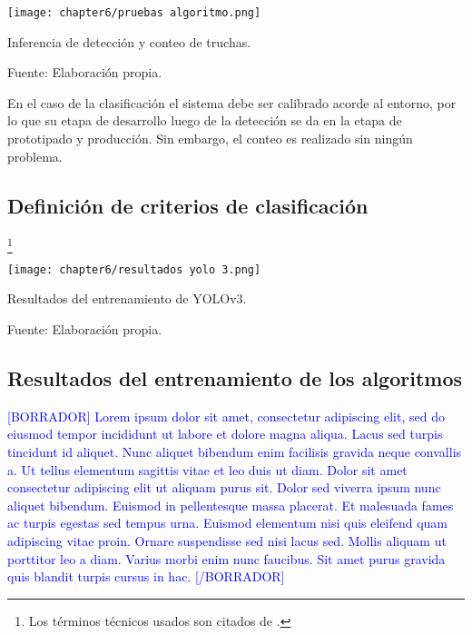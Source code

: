 \begin{myfigure}[H]
	\footnotesize\centering
	\texttt{[image: chapter6/pruebas algoritmo.png]}
	\caption{Inferencia de detección y conteo de truchas.}
	\begin{myflushcenter}
		Fuente: Elaboración propia.
	\end{myflushcenter}
	\label{fig:pruebas algoritmo}
\end{myfigure}

En el caso de la clasificación el sistema debe ser calibrado acorde al entorno, por lo que su etapa de desarrollo luego de la detección se da en la etapa de prototipado y producción. Sin embargo, el conteo es realizado sin ningún problema.





\subsection{Definición de criterios de clasificación}

\footnote{Los términos técnicos usados son citados de \cite{Everingham2010}.}


\begin{myfigure}[H]
	\footnotesize\centering
	\texttt{[image: chapter6/resultados yolo 3.png]}
	\caption{Resultados del entrenamiento de YOLOv3.}
	\begin{myflushcenter}
		Fuente: Elaboración propia.
	\end{myflushcenter}
	\label{fig:resultados yolo 3}
\end{myfigure}



\subsection{Resultados del entrenamiento de los algoritmos}

\textcolor{blue}{[BORRADOR] Lorem ipsum dolor sit amet, consectetur adipiscing elit, sed do eiusmod tempor incididunt ut labore et dolore magna aliqua. Lacus sed turpis tincidunt id aliquet. Nunc aliquet bibendum enim facilisis gravida neque convallis a. Ut tellus elementum sagittis vitae et leo duis ut diam. Dolor sit amet consectetur adipiscing elit ut aliquam purus sit. Dolor sed viverra ipsum nunc aliquet bibendum. Euismod in pellentesque massa placerat. Et malesuada fames ac turpis egestas sed tempus urna. Euismod elementum nisi quis eleifend quam adipiscing vitae proin. Ornare suspendisse sed nisi lacus sed. Mollis aliquam ut porttitor leo a diam. Varius morbi enim nunc faucibus. Sit amet purus gravida quis blandit turpis cursus in hac. [/BORRADOR]} 


